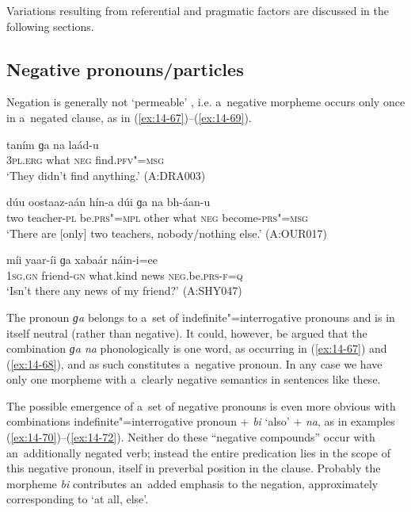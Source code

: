 Variations resulting from referential and pragmatic factors are discussed in the following sections.


\subsection{Negative pronouns/particles}
\label{subsec:14-3-2}

Negation is generally not `permeable' \citep[563]{ramat2006}, i.e. a~negative morpheme occurs only once in a~negated clause, as in (\ref{ex:14-67})--(\ref{ex:14-69}).

\begin{exe}
\ex
\label{ex:14-67}
\gll taním ɡa na laád-u \\
\textsc{3pl.erg} what \textsc{neg} find.\textsc{pfv"=msg}  \\
\glt `They didn't find anything.' (A:DRA003)

\ex
\label{ex:14-68}
\gll dúu oostaaz-aán hín-a dúi ɡa na  bh-áan-u \\
two teacher-\textsc{pl} be.\textsc{prs"=mpl} other what \textsc{neg}  become-\textsc{prs"=msg} \\
\glt `There are [only] two teachers, nobody/nothing else.' (A:OUR017)

\ex
\label{ex:14-69}
\gll míi yaar-íi ɡa xabaár náin-i=ee \\
\textsc{1sg.gn} friend-\textsc{gn} what.kind news \textsc{neg}.be.\textsc{prs-f=q}  \\
\glt `Isn't there any news of my friend?' (A:SHY047)
\end{exe}

The pronoun \textit{ɡa} belongs to a~set of indefinite"=interrogative pronouns and is in itself neutral (rather than negative). It could, however, be argued that the combination \textit{ɡa na} phonologically is one word, as occurring in (\ref{ex:14-67}) and (\ref{ex:14-68}), and as such constitutes a~negative pronoun. In any case we have only one morpheme with a~clearly negative semantics in sentences like these. 



The possible emergence of a~set of negative pronouns is even more obvious with combinations indefinite"=interrogative pronoun + \textit{bi} `also' + \textit{na}, as in examples (\ref{ex:14-70})--(\ref{ex:14-72}). Neither do these ``negative compounds'' occur with an~additionally negated verb; instead the entire predication lies in the scope of this negative pronoun, itself in preverbal position in the clause. Probably the morpheme \textit{bi} contributes an~added emphasis to the negation, approximately corresponding to `at all, else'.

